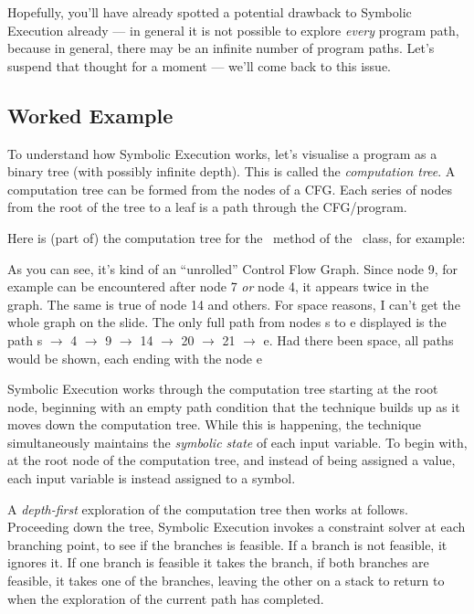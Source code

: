 Hopefully, you'll have already spotted a potential drawback to Symbolic
Execution already --- in general it is not possible to explore {\it every}
program path, because in general, there may be an infinite number of program
paths. Let's suspend that thought for a moment --- we'll come back to this issue.

\subsection{Worked Example}

To understand how Symbolic Execution works, let's visualise a program as a
binary tree (with possibly infinite depth). This is called the {\it computation
tree}. A computation tree can be formed from the nodes of a CFG. Each series of
nodes from the root of the tree to a leaf is a path through the CFG/program.

Here is (part of) the computation tree for the \classifymethod~method of the
\triangleclass~class, for example:

%

As you can see, it's kind of an ``unrolled'' Control Flow Graph. Since node 9,
for example can be encountered after node 7 {\it or} node 4, it appears twice in
the graph. The same is true of node 14 and others. For space reasons, I can't
get the whole graph on the slide. The only full path from nodes s to e displayed
is the path s $\rightarrow$ 4 $\rightarrow$ 9 $\rightarrow$ 14 $\rightarrow$ 20
$\rightarrow$ 21 $\rightarrow$ e. Had there been space, all paths would be
shown, each ending with the node e

Symbolic Execution works through the computation tree starting at the root node,
beginning with an empty path condition that the technique builds up as it moves
down the computation tree. While this is happening, the technique simultaneously
maintains the {\it symbolic state} of each input variable. To begin with, at the
root node of the computation tree, and instead of being assigned a value, each
input variable is instead assigned to a symbol. 

A {\it depth-first} exploration of the computation tree then works at follows.
Proceeding down the tree, Symbolic Execution invokes a constraint solver at each
branching point, to see if the branches is feasible. If a branch is not
feasible, it ignores it. If one branch is feasible it takes the branch, if both
branches are feasible, it takes one of the branches, leaving the other on a
stack to return to when the exploration of the current path has completed. 

